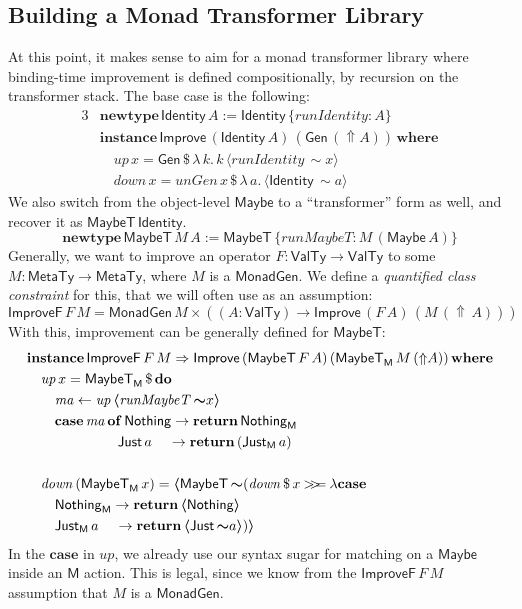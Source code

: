 \documentclass[acmsmall,screen,review,anonymous]{acmart}
\newcommand{\mit}[1]{\mathit{#1}}
\newcommand{\msf}[1]{\mathsf{#1}}
\newcommand{\mbf}[1]{\mathbf{#1}}
\newcommand{\bs}[1]{\boldsymbol{#1}}
\newcommand{\mdo}{\mbf{do}\,}
\newcommand{\ind}{\hspace{1em}}
\newcommand{\return}{\mbf{return}\,}
\newcommand{\lam}{\lambda\,}
\newcommand{\where}{\mbf{where}}
\newcommand{\M}{\msf{M}}
\newcommand{\of}{\mbf{of}\,}
\newcommand{\vma}{\mit{ma}}
\newcommand{\fro}{\leftarrow}
\newcommand{\case}{\mbf{case\,}}
\newcommand{\Lift}{{\Uparrow}}
\newcommand{\Up}{{\Uparrow}}
\newcommand{\spl}{{\bs{\sim}}}
\newcommand{\ql}{{\bs{\langle}}}
\newcommand{\qr}{{\bs{\rangle}}}
\newcommand{\bind}{\mathbin{>\!\!>\mkern-6.7mu=}}
\newcommand{\MTy}{\msf{MetaTy}}
\newcommand{\VTy}{\msf{ValTy}}
\newcommand{\Maybe}{\msf{Maybe}}
\newcommand{\MaybeT}{\msf{MaybeT}}
\newcommand{\Nothing}{\msf{Nothing}}
\newcommand{\Just}{\msf{Just}}
\theoremstyle{remark}
\newcommand{\mup}{\mit{up}}
\newcommand{\mdown}{\mit{down}}
\newcommand{\instance}{\mbf{instance}\,}
\newcommand{\Improve}{\msf{Improve}}
\newcommand{\Gen}{\msf{Gen}}
\newcommand{\unGen}{\mit{unGen}}
\newcommand{\qt}[1]{\ql#1\qr}
\newcommand{\MonadGen}{\msf{MonadGen}}
\newcommand{\RA}{\Rightarrow}
\newcommand{\Identity}{\msf{Identity}}
\newcommand{\runIdentity}{\mit{runIdentity}}
\newcommand{\newtype}{\mbf{newtype}\,}
\newcommand{\runMaybeT}{\mit{runMaybeT}}
\newcommand{\dlr}{\,\$\,}
\newcommand{\ImproveF}{\msf{ImproveF}}
\begin{document}
\subsection{Building a Monad Transformer Library}\label{monad-transformers}

At this point, it makes sense to aim for a monad transformer library where
binding-time improvement is defined compositionally, by recursion on the
transformer stack. The base case is the following:
\begin{alignat*}{3}
  & \newtype \Identity\,A := \Identity\,\{\runIdentity : A\} \\
  & \instance \Improve\,(\Identity\,A)\,(\Gen\,(\Up A))\,\where\\
  & \ind \mup\,x = \Gen \dlr \lam k.\,k\,\qt{\runIdentity\,\spl x}\\
  & \ind \mdown\,x = \unGen\,x \dlr \lam a.\,\qt{\Identity\,\spl a}
\end{alignat*}
We also switch from the object-level $\Maybe$ to a ``transformer'' form as well,
and recover it as $\MaybeT\,\Identity$.
\[ \newtype \MaybeT\,M\,A := \MaybeT\,\{\runMaybeT : M\,(\Maybe\,A)\} \]
Generally, we want to improve an operator $F : \VTy \to \VTy$ to some $M : \MTy
\to \MTy$, where $M$ is a $\MonadGen$. We define a \emph{quantified class
constraint} \cite{TODO} for this, that we will often use as an assumption:
\[ \ImproveF\,F\,M = \MonadGen\,M \times ((A : \VTy) \to \Improve\,(F\,A)\,(M\,(\Lift\,A))) \]
With this, improvement can be generally defined for $\MaybeT$:
\begin{alignat*}{3}
  &\instance \ImproveF\,F\,M \RA \Improve\,(\MaybeT\,F\,A)\,(\MaybeT_\M\,M\,(\Up A))\,\where\\
  &\ind \mup\,x = \MaybeT_\M \dlr \mdo\\
  &\ind\ind \vma \fro \mup\,\qt{\runMaybeT\,\spl x}\\
  &\ind\ind \case \vma\,\of \Nothing \to \return \Nothing_\M\\
  &\hspace{6.5em}         \Just\,a \hspace{1.15em}\to \return (\Just_\M\,a)\\
  &\\
  &\ind \mdown\,(\MaybeT_\M\,x) = \qt{\MaybeT\,\spl(\mdown \dlr x \bind \lambda\case\\
  &\ind\ind\Nothing_\M \to \return \qt{\Nothing}\\
  &\ind\ind\Just_\M\,a\hspace{1.15em} \to \return \qt{\Just\,\spl a})}
\end{alignat*}
In the $\mbf{case}$ in $\mup$, we already use our syntax sugar for matching on a $\Maybe$
inside an $\M$ action. This is legal, since we know from the $\ImproveF\,F\,M$ assumption
that $M$ is a $\MonadGen$.
\end{document}
